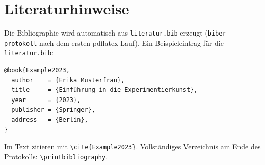 \section{Literaturhinweise}
\label{sec:literatur}

Die Bibliographie wird automatisch aus \texttt{literatur.bib} erzeugt
(\texttt{biber protokoll} nach dem ersten pdflatex-Lauf). Ein
Beispieleintrag für die \texttt{literatur.bib}:

\begin{verbatim}
@book{Example2023,
  author    = {Erika Musterfrau},
  title     = {Einführung in die Experimentierkunst},
  year      = {2023},
  publisher = {Springer},
  address   = {Berlin},
}
\end{verbatim}

Im Text zitieren mit \texttt{\textbackslash cite\{Example2023\}}.
Vollständiges Verzeichnis am Ende des Protokolls:
\texttt{\textbackslash printbibliography}.
